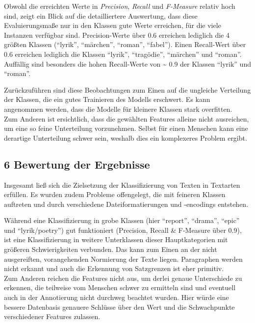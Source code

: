 \documentclass[]{article}
\begin{document}
Obwohl die erreichten Werte in \emph{Precision}, \emph{Recall} und
\emph{F-Measure} relativ hoch sind, zeigt ein Blick auf die
detailliertere Auswertung, dass diese Evaluierungsmaße nur in den
Klassen gute Werte erreichen, für die viele Instanzen verfügbar sind.
Precision-Werte über 0.6 erreichen lediglich die 4 größten Klassen
(``lyrik'', ``märchen'', ``roman'', ``fabel''). Einen Recall-Wert über
0.6 erreichen lediglich die Klassen ``lyrik'', ``tragödie'', ``märchen''
und ``roman''. Auffällig sind besonders die hohen Recall-Werte von
\textasciitilde{} 0.9 der Klassen ``lyrik'' und ``roman''.

Zurückzuführen sind diese Beobachtungen zum Einen auf die ungleiche
Verteilung der Klassen, die ein gutes Trainieren des Modells erschwert.
Es kann angenommen werden, dass die Modelle für kleinere Klassen stark
overfitten.\\
Zum Anderen ist ersichtlich, dass die gewählten Features alleine nicht
ausreichen, um eine so feine Unterteilung vorzunehmen. Selbst für einen
Menschen kann eine derartige Unterteilung schwer sein, weshalb dies ein
komplexeres Problem ergibt.

\subsection{6 Bewertung der Ergebnisse}\label{bewertung-der-ergebnisse}

Insgesamt ließ sich die Zielsetzung der Klassifizierung von Texten in
Textarten erfüllen. Es wurden zudem Probleme offengelegt, die mit
feineren Klassen auftreten und durch verschiedene Dateiformatierungen
und -encodings entstehen.

Während eine Klassifizierung in grobe Klassen (hier ``report'',
``drama'', ``epic'' und ``lyrik/poetry'') gut funktioniert (Precision,
Recall \& F-Measure über 0.9), ist eine Klassifizierung in weitere
Unterklassen dieser Hauptkategorien mit größeren Schwierigkeiten
verbunden. Das kann zum Einen an der nicht ausgereiften, vorangehenden
Normierung der Texte liegen. Paragraphen werden nicht erkannt und auch
die Erkennung von Satzgrenzen ist eher primitiv.\\
Zum Anderen reichen die Features nicht aus, um derlei genaue
Unterschiede zu erkennen, die teilweise vom Menschen schwer zu ermitteln
sind und eventuell auch in der Annotierung nicht durchweg beachtet
wurden. Hier würde eine bessere Datenbasis genauere Schlüsse über den
Wert und die Schwachpunkte verschiedener Features zulassen.
\end{document}

